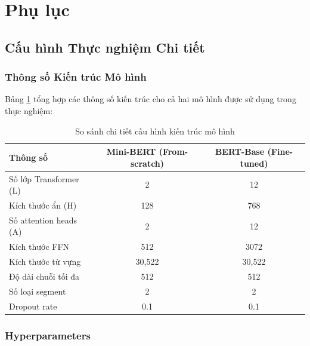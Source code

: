 \section{Phụ lục}
\label{sec:appendix}

\subsection{Cấu hình Thực nghiệm Chi tiết}
\label{subsec:experiment_config}

\subsubsection{Thông số Kiến trúc Mô hình}
\label{subsubsec:model_architecture}

Bảng \ref{tab:model_configs} tổng hợp các thông số kiến trúc cho cả hai mô hình được sử dụng trong thực nghiệm:

\begin{table}[H]
\centering
\caption{So sánh chi tiết cấu hình kiến trúc mô hình}
\label{tab:model_configs}
\begin{tabular}{lcc}
\toprule
\textbf{Thông số} & \textbf{Mini-BERT (From-scratch)} & \textbf{BERT-Base (Fine-tuned)} \\
\midrule
Số lớp Transformer (L) & 2 & 12 \\
Kích thước ẩn (H) & 128 & 768 \\
Số attention heads (A) & 2 & 12 \\
Kích thước FFN & 512 & 3072 \\
Kích thước từ vựng & 30,522 & 30,522 \\
Độ dài chuỗi tối đa & 512 & 512 \\
Số loại segment & 2 & 2 \\
Dropout rate & 0.1 & 0.1 \\
\bottomrule
\end{tabular}
\end{table}

\subsubsection{Hyperparameters}
\label{subsubsec:training_hyperparams}

